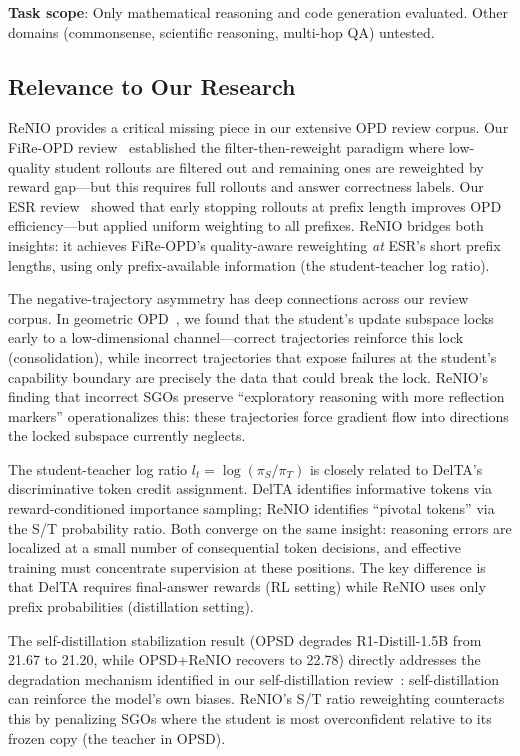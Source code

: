 \documentclass[11pt,a4paper]{article}
\begin{document}
\textbf{Task scope}: Only mathematical reasoning and code generation evaluated. Other domains (commonsense, scientific reasoning, multi-hop QA) untested.

\subsection{Relevance to Our Research}

ReNIO provides a critical missing piece in our extensive OPD review corpus. Our FiRe-OPD review~\cite{li2026fireopd} established the filter-then-reweight paradigm where low-quality student rollouts are filtered out and remaining ones are reweighted by reward gap---but this requires full rollouts and answer correctness labels. Our ESR review~\cite{wang2026esr} showed that early stopping rollouts at prefix length improves OPD efficiency---but applied uniform weighting to all prefixes. ReNIO bridges both insights: it achieves FiRe-OPD's quality-aware reweighting \emph{at} ESR's short prefix lengths, using only prefix-available information (the student-teacher log ratio).

The negative-trajectory asymmetry has deep connections across our review corpus. In geometric OPD~\cite{shen2026geometry}, we found that the student's update subspace locks early to a low-dimensional channel---correct trajectories reinforce this lock (consolidation), while incorrect trajectories that expose failures at the student's capability boundary are precisely the data that could break the lock. ReNIO's finding that incorrect SGOs preserve ``exploratory reasoning with more reflection markers'' operationalizes this: these trajectories force gradient flow into directions the locked subspace currently neglects.

The student-teacher log ratio $l_t = \log(\pi_S/\pi_T)$ is closely related to DelTA's~\cite{wang2026delta} discriminative token credit assignment. DelTA identifies informative tokens via reward-conditioned importance sampling; ReNIO identifies ``pivotal tokens'' via the S/T probability ratio. Both converge on the same insight: reasoning errors are localized at a small number of consequential token decisions, and effective training must concentrate supervision at these positions. The key difference is that DelTA requires final-answer rewards (RL setting) while ReNIO uses only prefix probabilities (distillation setting).

The self-distillation stabilization result (OPSD degrades R1-Distill-1.5B from 21.67 to 21.20, while OPSD+ReNIO recovers to 22.78) directly addresses the degradation mechanism identified in our self-distillation review~\cite{wang2026selfdistill}: self-distillation can reinforce the model's own biases. ReNIO's S/T ratio reweighting counteracts this by penalizing SGOs where the student is most overconfident relative to its frozen copy (the teacher in OPSD).
\end{document}
